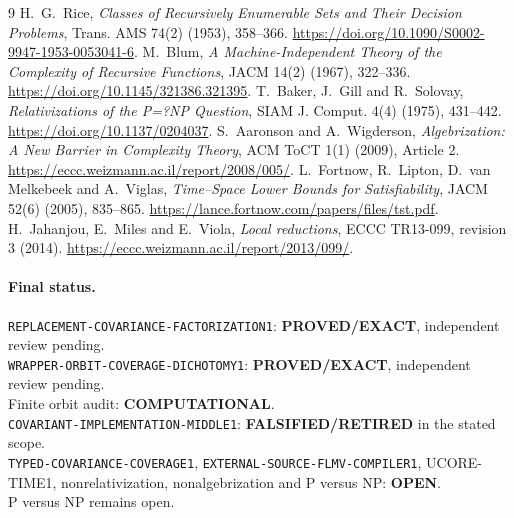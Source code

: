 \documentclass[11pt]{article}
\newcommand{\EXACT}{\textbf{PROVED/EXACT}}
\newcommand{\OPEN}{\textbf{OPEN}}
\newcommand{\RETIRED}{\textbf{FALSIFIED/RETIRED}}
\newcommand{\COMP}{\textbf{COMPUTATIONAL}}
\begin{document}
\begin{thebibliography}{9}
 H.~G.~Rice, \emph{Classes of Recursively Enumerable Sets and
Their Decision Problems}, Trans. AMS 74(2) (1953), 358--366.
\url{https://doi.org/10.1090/S0002-9947-1953-0053041-6}.
 M.~Blum, \emph{A Machine-Independent Theory of the
Complexity of Recursive Functions}, JACM 14(2) (1967), 322--336.
\url{https://doi.org/10.1145/321386.321395}.
 T.~Baker, J.~Gill and R.~Solovay,
\emph{Relativizations of the P=?NP Question}, SIAM J. Comput. 4(4) (1975),
431--442. \url{https://doi.org/10.1137/0204037}.
 S.~Aaronson and A.~Wigderson, \emph{Algebrization: A New
Barrier in Complexity Theory}, ACM ToCT 1(1) (2009), Article 2.
\url{https://eccc.weizmann.ac.il/report/2008/005/}.
 L.~Fortnow, R.~Lipton, D.~van Melkebeek and A.~Viglas,
\emph{Time--Space Lower Bounds for Satisfiability}, JACM 52(6) (2005),
835--865. \url{https://lance.fortnow.com/papers/files/tst.pdf}.
 H.~Jahanjou, E.~Miles and E.~Viola,
\emph{Local reductions}, ECCC TR13-099, revision 3 (2014).
\url{https://eccc.weizmann.ac.il/report/2013/099/}.
\end{thebibliography}

\paragraph{Final status.}
\texttt{REPLACEMENT-COVARIANCE-FACTORIZATION1}: \EXACT, independent review pending.\\
\texttt{WRAPPER-ORBIT-COVERAGE-DICHOTOMY1}: \EXACT, independent review pending.\\
Finite orbit audit: \COMP.\\
\texttt{COVARIANT-IMPLEMENTATION-MIDDLE1}: \RETIRED{} in the stated scope.\\
\texttt{TYPED-COVARIANCE-COVERAGE1},
\texttt{EXTERNAL-SOURCE-FLMV-COMPILER1}, UCORE-TIME1,
nonrelativization, nonalgebrization and P versus NP: \OPEN.\\
P versus NP remains open.

\end{document}
